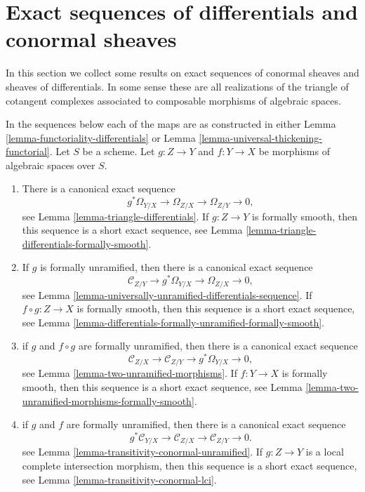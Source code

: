 \section{Exact sequences of differentials and conormal sheaves}
\label{section-exact}

\noindent
In this section we collect some results on exact sequences of conormal
sheaves and sheaves of differentials. In some sense these are all
realizations of the triangle of cotangent complexes associated to
composable morphisms of algebraic spaces.

\medskip\noindent
In the sequences below each of the maps
are as constructed in either
Lemma \ref{lemma-functoriality-differentials} or
Lemma \ref{lemma-universal-thickening-functorial}.
Let $S$ be a scheme. Let $g : Z \to Y$ and $f : Y \to X$ be morphisms of
algebraic spaces over $S$.
\begin{enumerate}
\item There is a canonical exact sequence
$$
g^*\Omega_{Y/X} \to \Omega_{Z/X} \to \Omega_{Z/Y} \to 0,
$$
see
Lemma \ref{lemma-triangle-differentials}.
If $g : Z \to Y$ is formally smooth, then this sequence is a short
exact sequence, see
Lemma \ref{lemma-triangle-differentials-formally-smooth}.
\item If $g$ is formally unramified, then there is a canonical exact sequence
$$
\mathcal{C}_{Z/Y} \to g^*\Omega_{Y/X} \to \Omega_{Z/X} \to 0,
$$
see
Lemma \ref{lemma-universally-unramified-differentials-sequence}.
If $f \circ g : Z \to X$ is formally smooth, then this sequence is a short
exact sequence, see
Lemma \ref{lemma-differentials-formally-unramified-formally-smooth}.
\item if $g$ and $f \circ g$ are formally unramified, then there is a
canonical exact sequence
$$
\mathcal{C}_{Z/X} \to \mathcal{C}_{Z/Y} \to g^*\Omega_{Y/X} \to 0,
$$
see
Lemma \ref{lemma-two-unramified-morphisms}.
If $f : Y \to X$ is formally smooth, then this sequence is a short
exact sequence, see
Lemma \ref{lemma-two-unramified-morphisms-formally-smooth}.
\item if $g$ and $f$ are formally unramified, then there is a canonical
exact sequence
$$
g^*\mathcal{C}_{Y/X} \to \mathcal{C}_{Z/X} \to \mathcal{C}_{Z/Y} \to 0.
$$
see
Lemma \ref{lemma-transitivity-conormal-unramified}.
If $g : Z \to Y$ is a local complete intersection morphism,
then this sequence is a short exact sequence, see
Lemma \ref{lemma-transitivity-conormal-lci}.
\end{enumerate}











